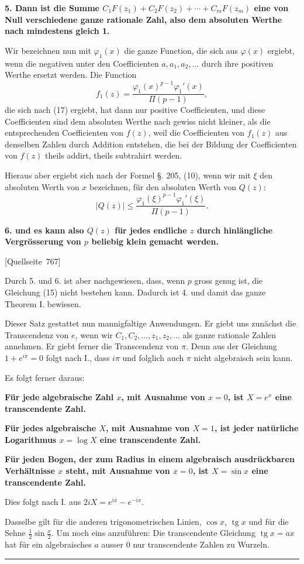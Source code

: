 \documentclass[11pt]{article}
\newcommand{\srcpage}[1]{\par\medskip\noindent\textsf{[Quellseite~#1]}\par\smallskip}
\newcommand{\abs}[1]{\left|#1\right|}
\DeclareMathOperator{\tg}{tg}
\begin{document}
\textbf{5. Dann ist die Summe $C_1F(z_1)+C_2F(z_2)+\cdots+C_mF(z_m)$ eine von Null verschiedene ganze rationale Zahl, also dem absoluten Werthe nach mindestens gleich 1.}

Wir bezeichnen nun mit $\varphi_1(x)$ die ganze Function, die sich aus $\varphi(x)$ ergiebt, wenn die negativen unter den Coefficienten $a,a_1,a_2,\ldots$ durch ihre positiven Werthe ersetzt werden. Die Function
\[
f_1(z)=\frac{\varphi_1(x)^{p-1}\varphi_1'(x)}{\Pi(p-1)},
\]
die sich nach (17) ergiebt, hat dann nur positive Coefficienten, und diese Coefficienten sind dem absoluten Werthe nach gewiss nicht kleiner, als die entsprechenden Coefficienten von $f(z)$, weil die Coefficienten von $f_1(z)$ aus denselben Zahlen durch Addition entstehen, die bei der Bildung der Coefficienten von $f(z)$ theils addirt, theils subtrahirt werden.

Hieraus aber ergiebt sich nach der Formel §. 205, (10), wenn wir mit $\xi$ den absoluten Werth von $x$ bezeichnen, für den absoluten Werth von $Q(z)$:
\[
\abs{Q(z)}\leq \frac{\varphi_1(\xi)^{p-1}\varphi_1'(\xi)}{\Pi(p-1)}.
\]

\textbf{6. und es kann also $Q(z)$ für jedes endliche $z$ durch hinlängliche Vergrösserung von $p$ beliebig klein gemacht werden.}

\srcpage{767}
Durch 5. und 6. ist aber nachgewiesen, dass, wenn $p$ gross genug ist, die Gleichung (15) nicht bestehen kann. Dadurch ist 4. und damit das ganze Theorem I. bewiesen.

Dieser Satz gestattet nun mannigfaltige Anwendungen. Er giebt uns zunächst die Transcendenz von $e$, wenn wir $C_1,C_2,\ldots,z_1,z_2,\ldots$ als ganze rationale Zahlen annehmen. Er giebt ferner die Transcendenz von $\pi$. Denn aus der Gleichung $1+e^{i\pi}=0$ folgt nach I., dass $i\pi$ und folglich auch $\pi$ nicht algebraisch sein kann.

Es folgt ferner daraus:

\begin{center}
\textbf{Für jede algebraische Zahl $x$, mit Ausnahme von $x=0$, ist $X=e^x$ eine transcendente Zahl.}

\textbf{Für jedes algebraische $X$, mit Ausnahme von $X=1$, ist jeder natürliche Logarithmus $x=\log X$ eine transcendente Zahl.}

\textbf{Für jeden Bogen, der zum Radius in einem algebraisch ausdrückbaren Verhältnisse $x$ steht, mit Ausnahme von $x=0$, ist $X=\sin x$ eine transcendente Zahl.}
\end{center}

Dies folgt nach I. aus $2iX=e^{ix}-e^{-ix}$.

Dasselbe gilt für die anderen trigonometrischen Linien, $\cos x$, $\tg x$ und für die Sehne $\frac12\sin\frac{x}{2}$. Um noch eins anzuführen: Die transcendente Gleichung $\tg x=ax$ hat für ein algebraisches $a$ ausser 0 nur transcendente Zahlen zu Wurzeln.

\bigskip
\begin{center}\rule{0.28\linewidth}{0.4pt}\end{center}
\end{document}
